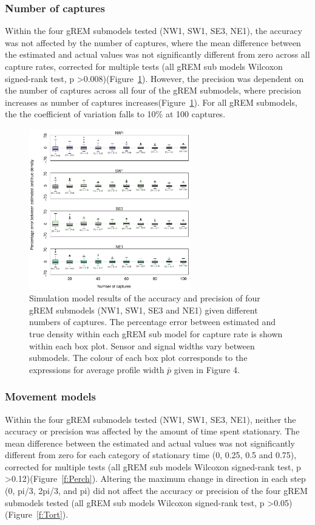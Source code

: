 \documentclass[a4paper,10pt,reqno,oneside]{amsart}
\begin{document}
\subsubsection{Number of captures}

Within the four gREM submodels tested (NW1, SW1, SE3, NE1), the  accuracy was not affected by the number of captures, where the mean difference between the estimated and actual values was not significantly different from zero across all capture rates, corrected for multiple tests (all gREM sub models Wilcoxon signed-rank test, p \textgreater 0.008)(Figure~\ref{f:Captures}). However, the precision was dependent on the number of captures across all four of the gREM submodels, where precision increases as number of captures increases(Figure~\ref{f:Captures}). For all gREM submodels, the the coefficient of variation falls to 10\% at 100 captures. 

\begin{figure}[t]
       \centering
	\includegraphics[width=7cm]{imgs/ResultsNoCaptures.pdf}
        \caption{Simulation model results of the accuracy and precision of four gREM submodels (NW1, SW1, SE3 and NE1) given different numbers of captures. The percentage error between estimated and true density within each gREM sub model for capture rate is shown within each box plot. Sensor and signal widths vary between submodels. The colour of each box plot corresponds to the expressions for average profile width $\bar{p}$ given in Figure 4. }            
	\label{f:Captures}
\end{figure}



\subsubsection{Movement models}

Within the four gREM submodels tested (NW1, SW1, SE3, NE1), neither the  accuracy or precision was affected by the amount of time spent stationary. The mean difference between the estimated and actual values was not significantly different from zero for each category of stationary time (0, 0.25, 0.5 and 0.75), corrected for multiple tests (all gREM sub models Wilcoxon signed-rank test, p \textgreater 0.12)(Figure~\ref{f:Perch}). Altering the maximum change in direction in each step (0, pi/3, 2pi/3, and pi) did not affect the accuracy or precision of the four gREM submodels tested (all gREM sub models Wilcoxon signed-rank test, p \textgreater 0.05)(Figure~\ref{f:Tort}). 
\end{document}
